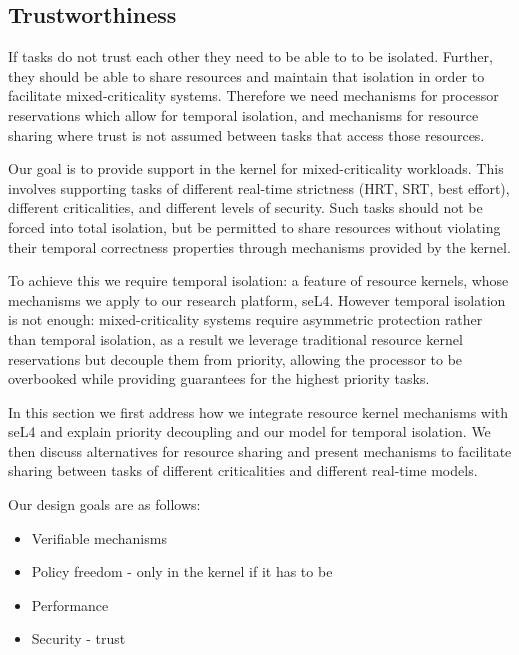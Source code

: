 
\subsection{Trustworthiness}

If tasks do not trust each other they need to be able to to be isolated.
Further, they should be able to share resources and maintain that isolation in order to facilitate
mixed-criticality systems.
Therefore we need mechanisms for processor reservations which allow for temporal isolation, and
mechanisms for resource sharing where trust is not assumed between tasks that access those
resources.








Our goal is to provide support in the kernel for mixed-criticality workloads.
This involves supporting tasks of different real-time strictness (\gls{HRT}, \gls{SRT}, best effort), different criticalities, and different levels of security.
Such tasks should not be forced into total isolation, but be permitted to share resources without violating their temporal correctness properties through mechanisms provided by the kernel.

To achieve this we require temporal isolation: a feature of resource kernels, whose mechanisms we apply to our research platform, seL4.
However temporal isolation is not enough: mixed-criticality systems require asymmetric protection rather than temporal isolation, as a result we leverage traditional resource kernel reservations but decouple them from priority, allowing the processor to be overbooked while providing guarantees for the highest priority tasks.

In this section we first address how we integrate resource kernel mechanisms with seL4 and explain priority decoupling and our model for temporal isolation.
We then discuss alternatives for resource sharing and present mechanisms to facilitate sharing between tasks of different criticalities and different real-time models.

Our design goals are as follows:

\begin{itemize}
\item Verifiable mechanisms
\item Policy freedom - only in the kernel if it has to be
\item Performance
\item Security - trust
\end{itemize}




